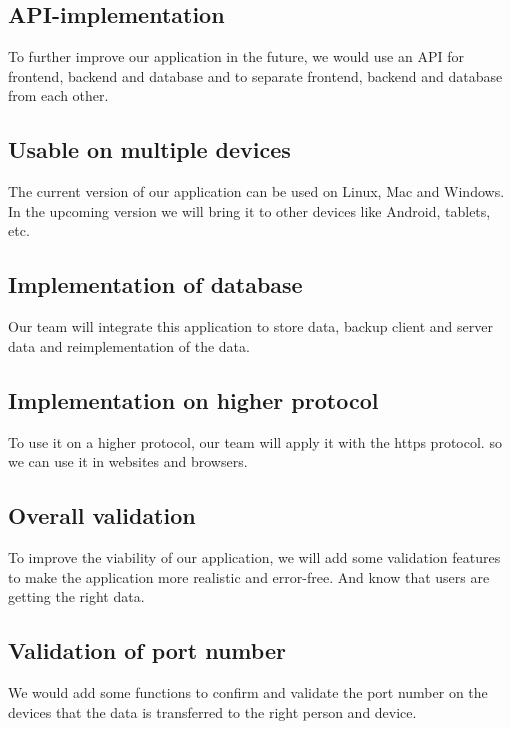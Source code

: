     \subsection{API-implementation}\label{subsec:apiimplementation}
    To further improve our application in the future, we would use an API for frontend,
    backend and database and to separate frontend, backend and database from each other.

    \subsection{Usable on multiple devices} \label{subsec:usableonmultipledevices}
    The current version of our application can be used on Linux, Mac and Windows.
    In the upcoming version we will bring it to other devices like Android, tablets, etc.

    \subsection{Implementation  of database}\label{subsec:implementationdatabase}
    Our team will integrate this application to store data, backup client and server data and
    reimplementation of the data.

    \subsection{Implementation on higher protocol}\label{subsec:implementationonhigherprotocol}
    To use it on a higher protocol, our team will apply it with the https protocol.
    so we can use it in websites and browsers.


    \subsection{Overall validation}\label{subsec:validationoverall}
    To improve the viability of our application, we will add some validation features
    to make the application more realistic and error-free.
    And know that users are getting the right data.


    \subsection{Validation of port number}\label{subsec:validateofportnumber}
    We would add some functions to confirm and validate the port number on the devices
    that the data is transferred to the right person and device.

   




